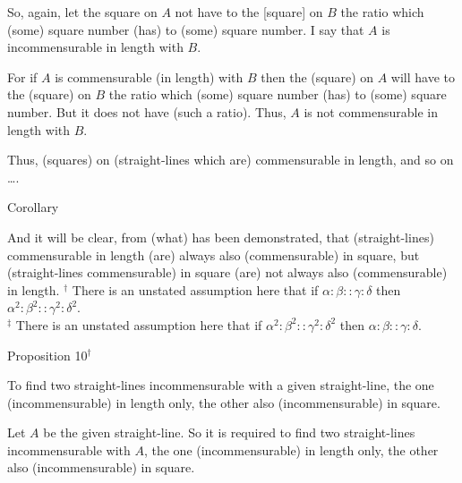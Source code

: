 So, again, let the square on $A$ not have to the [square] on $B$
the ratio which (some) square number (has) to (some) square number.
I say that $A$ is incommensurable in length with $B$.

For if $A$ is commensurable (in length) with $B$ then  the 
(square) on $A$ will have to the (square) on $B$ the ratio which (some) square
number (has) to (some) square number. But it does not have (such a ratio). 
Thus, $A$ is not commensurable in length with $B$.

Thus, (squares) on (straight-lines which are) commensurable in length,
and so on \ldots.\\

\begin{center}
{\large Corollary}
\end{center}\vspace*{-7pt}

And it will be clear, from (what) has been demonstrated, that (straight-lines)
commensurable in length (are) always also (commensurable) in square, 
but (straight-lines commensurable) in square (are) not always also (commensurable)
in length.
{\footnotesize\noindent$^\dag$ There is an unstated assumption here that if $\alpha:\beta::\gamma:\delta$ then $\alpha^2:\beta^2::\gamma^2:\delta^2$.\\[0.5ex]
$^\ddag$ There is an unstated
assumption here that if $\alpha^2:\beta^2::\gamma^2:\delta^2$ then $\alpha:\beta::\gamma:\delta$.}


\begin{center}
{\large Proposition 10}$^\dag$
\end{center}

To find two straight-lines incommensurable
with a given straight-line, the one (incommensurable) in length only,
the other also (incommensurable) in square.

\epsfysize=1.5in
\centerline{}

Let $A$ be the given straight-line. So it is required to find two straight-lines
incommensurable with $A$, the one (incommensurable) in length only,
the other also (incommensurable) in square.

